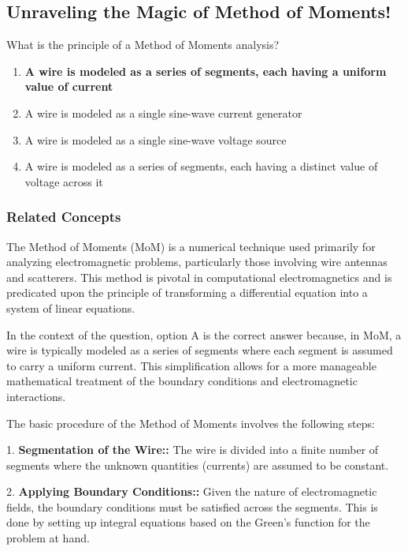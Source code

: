 \subsection{Unraveling the Magic of Method of Moments!}

\begin{tcolorbox}[colback=gray!10, colframe=black, title=E9B10] What is the principle of a Method of Moments analysis?
\begin{enumerate}[label=\Alph*.]
    \item \textbf{A wire is modeled as a series of segments, each having a uniform value of current}
    \item A wire is modeled as a single sine-wave current generator
    \item A wire is modeled as a single sine-wave voltage source
    \item A wire is modeled as a series of segments, each having a distinct value of voltage across it
\end{enumerate} \end{tcolorbox}

\subsubsection{Related Concepts}

The Method of Moments (MoM) is a numerical technique used primarily for analyzing electromagnetic problems, particularly those involving wire antennas and scatterers. This method is pivotal in computational electromagnetics and is predicated upon the principle of transforming a differential equation into a system of linear equations.

In the context of the question, option A is the correct answer because, in MoM, a wire is typically modeled as a series of segments where each segment is assumed to carry a uniform current. This simplification allows for a more manageable mathematical treatment of the boundary conditions and electromagnetic interactions.

The basic procedure of the Method of Moments involves the following steps:

1. \textbf{Segmentation of the Wire::} The wire is divided into a finite number of segments where the unknown quantities (currents) are assumed to be constant.

2. \textbf{Applying Boundary Conditions::} Given the nature of electromagnetic fields, the boundary conditions must be satisfied across the segments. This is done by setting up integral equations based on the Green's function for the problem at hand.

